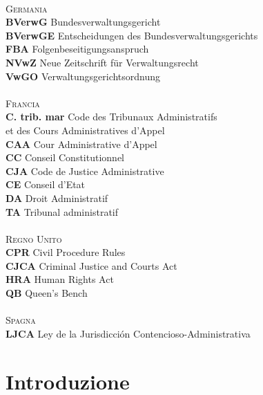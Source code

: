 \documentclass[12pt,it,a4paper,]{report}
\begin{document}
\begin{tabbing}
 \> \\
\textsc{Germania} \> \\
\textbf{BVerwG} \> Bundesverwaltungsgericht \\
\textbf{BVerwGE} \> Entscheidungen des Bundesverwaltungsgerichts \\
\textbf{FBA} \> Folgenbeseitigungsanspruch \\
\textbf{NVwZ} \> Neue Zeitschrift für Verwaltungsrecht \\
\textbf{VwGO} \> Verwaltungsgerichtsordnung \\
 \> \\
\textsc{Francia} \> \\
\textbf{C. trib. mar} \> Code des Tribunaux Administratifs \\
\textbf{} \>   et des Cours Administratives d’Appel \\
\textbf{CAA} \> Cour Administrative d'Appel \\
\textbf{CC} \> Conseil Constitutionnel \\
\textbf{CJA} \> Code de Justice Administrative \\
\textbf{CE} \> Conseil d'Etat \\
\textbf{DA} \> Droit Administratif \\
\textbf{TA} \> Tribunal administratif \\
 \> \\
\textsc{Regno Unito} \> \\
\textbf{CPR} \> Civil Procedure Rules \\
\textbf{CJCA} \> Criminal Justice and Courts Act \\
\textbf{HRA} \> Human Rights Act \\
\textbf{QB} \> Queen's Bench \\
 \> \\
\textsc{Spagna} \> \\
\textbf{LJCA} \> Ley de la Jurisdicción Contencioso-Administrativa \\

\end{tabbing}
\newpage

\setcounter{page}{1}
\doublespacing
\setlength{\parindent}{0.5in}

\hypertarget{introduzione}{%
\chapter*{Introduzione}\label{introduzione}}
\end{document}
